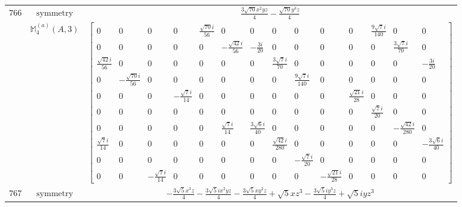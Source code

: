 \documentclass[fleqn,8pt,landscape]{jsarticle}
\begin{document}
\begin{longtable}{ccc}
$ 766 $ & $ \text{symmetry} $ & $ \frac{3 \sqrt{70} x^{2} y z}{4} - \frac{\sqrt{70} y^{3} z}{4} $ \\
$  $ & $ \mathbb{M}_{4}^{(a)}(A,3) $ & $ \begin{bmatrix} 0 & 0 & 0 & 0 & \frac{\sqrt{70} i}{56} & 0 & 0 & 0 & 0 & 0 & 0 & \frac{9 \sqrt{7} i}{140} & 0 & 0 \\ 0 & 0 & 0 & 0 & 0 & - \frac{\sqrt{42} i}{56} & - \frac{3 i}{20} & 0 & 0 & 0 & 0 & 0 & \frac{3 \sqrt{7} i}{70} & 0 \\ \frac{\sqrt{42} i}{56} & 0 & 0 & 0 & 0 & 0 & 0 & \frac{3 \sqrt{7} i}{70} & 0 & 0 & 0 & 0 & 0 & - \frac{3 i}{20} \\ 0 & - \frac{\sqrt{70} i}{56} & 0 & 0 & 0 & 0 & 0 & 0 & \frac{9 \sqrt{7} i}{140} & 0 & 0 & 0 & 0 & 0 \\ 0 & 0 & 0 & - \frac{\sqrt{7} i}{14} & 0 & 0 & 0 & 0 & 0 & 0 & \frac{\sqrt{21} i}{28} & 0 & 0 & 0 \\ 0 & 0 & 0 & 0 & 0 & 0 & 0 & 0 & 0 & 0 & 0 & \frac{\sqrt{7} i}{20} & 0 & 0 \\ 0 & 0 & 0 & 0 & 0 & \frac{\sqrt{7} i}{14} & \frac{3 \sqrt{6} i}{40} & 0 & 0 & 0 & 0 & 0 & - \frac{\sqrt{42} i}{280} & 0 \\ \frac{\sqrt{7} i}{14} & 0 & 0 & 0 & 0 & 0 & 0 & \frac{\sqrt{42} i}{280} & 0 & 0 & 0 & 0 & 0 & - \frac{3 \sqrt{6} i}{40} \\ 0 & 0 & 0 & 0 & 0 & 0 & 0 & 0 & - \frac{\sqrt{7} i}{20} & 0 & 0 & 0 & 0 & 0 \\ 0 & 0 & - \frac{\sqrt{7} i}{14} & 0 & 0 & 0 & 0 & 0 & 0 & - \frac{\sqrt{21} i}{28} & 0 & 0 & 0 & 0 \end{bmatrix} $ \\ \hline
$ 767 $ & $ \text{symmetry} $ & $ - \frac{3 \sqrt{5} x^{3} z}{4} - \frac{3 \sqrt{5} i x^{2} y z}{4} - \frac{3 \sqrt{5} x y^{2} z}{4} + \sqrt{5} x z^{3} - \frac{3 \sqrt{5} i y^{3} z}{4} + \sqrt{5} i y z^{3} $ \\

\end{longtable}
\end{document}
